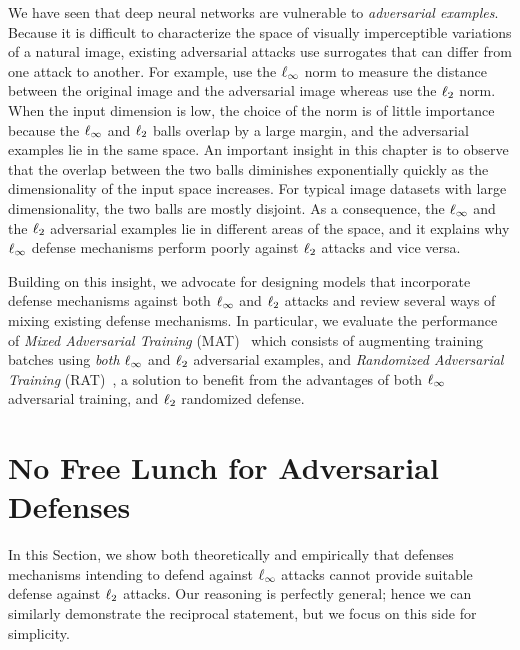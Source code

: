 We have seen that deep neural networks are vulnerable to \emph{adversarial examples}.
Because it is difficult to characterize the space of visually imperceptible variations of a natural image, existing adversarial attacks use surrogates that can differ from one attack to another.
For example, \citet{goodfellow2014explaining} use the $\ell_\infty $ norm to measure the distance between the original image and the adversarial image whereas \citet{carlini2017towards} use the $\ell_2 $ norm.
When the input dimension is low, the choice of the norm is of little importance because the $\ell_\infty $ and $\ell_2 $ balls overlap by a large margin, and the adversarial examples lie in the same space.
An important insight in this chapter is to observe that the overlap between the two balls diminishes exponentially quickly as the dimensionality of the input space increases.
For typical image datasets with large dimensionality, the two balls are mostly disjoint.
As a consequence, the $\ell_\infty $ and the $\ell_2 $ adversarial examples lie in different areas of the space, and it explains why $\ell_\infty $ defense mechanisms perform poorly against $\ell_2 $ attacks and vice versa. 

Building on this insight, we advocate for designing models that incorporate defense mechanisms against both $\ell_\infty $ and $\ell_2 $ attacks and review several ways of mixing existing defense mechanisms.
In particular, we evaluate the performance of \emph{Mixed Adversarial Training} (MAT)~\cite{goodfellow2014explaining} which consists of  augmenting training batches using \emph{both} $\ell_\infty $ and $\ell_2 $ adversarial examples, and {\em Randomized Adversarial Training} (RAT)~\cite{salman2019provably}, a solution to benefit from the advantages of both $\ell_\infty $ adversarial training, and $\ell_2 $ randomized defense. 


\section{No Free Lunch for Adversarial Defenses}
\label{section:ap4-no_free_lunch}

In this Section, we show both theoretically and empirically that defenses mechanisms intending to defend against $\ell_\infty $ attacks cannot provide suitable defense against $\ell_2 $ attacks.
Our reasoning is perfectly general; hence we can similarly demonstrate the reciprocal statement, but we focus on this side for simplicity.


